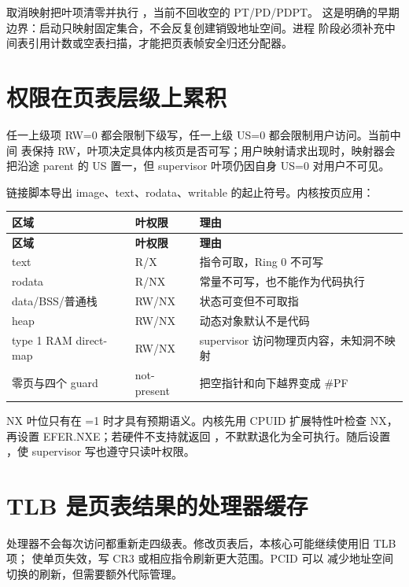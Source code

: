 取消映射把叶项清零并执行 ，当前不回收空的 PT/PD/PDPT。
这是明确的早期边界：启动只映射固定集合，不会反复创建销毁地址空间。进程
阶段必须补充中间表引用计数或空表扫描，才能把页表帧安全归还分配器。

\section{权限在页表层级上累积}

任一上级项 RW=0 都会限制下级写，任一上级 US=0 都会限制用户访问。当前中间
表保持 RW，叶项决定具体内核页是否可写；用户映射请求出现时，映射器会把沿途
parent 的 US 置一，但 supervisor 叶项仍因自身 US=0 对用户不可见。

链接脚本导出 image、text、rodata、writable 的起止符号。内核按页应用：

\begin{longtable}{L{0.23\textwidth}L{0.18\textwidth}L{0.45\textwidth}}
\toprule
\textbf{区域} & \textbf{叶权限} & \textbf{理由}\\
\midrule
\endfirsthead
\toprule
\textbf{区域} & \textbf{叶权限} & \textbf{理由}\\
\midrule
\endhead
text & R/X & 指令可取，Ring 0 不可写\\
rodata & R/NX & 常量不可写，也不能作为代码执行\\
data/BSS/普通栈 & RW/NX & 状态可变但不可取指\\
heap & RW/NX & 动态对象默认不是代码\\
type 1 RAM direct-map & RW/NX & supervisor 访问物理页内容，未知洞不映射\\
零页与四个 guard & not-present & 把空指针和向下越界变成 \#PF\\
\bottomrule
\end{longtable}

NX 叶位只有在 =1 时才具有预期语义。内核先用 CPUID
扩展特性叶检查 NX，再设置 EFER.NXE；若硬件不支持就返回
，不默默退化为全可执行。随后设置
，使 supervisor 写也遵守只读叶权限。

\section{TLB 是页表结果的处理器缓存}

处理器不会每次访问都重新走四级表。修改页表后，本核心可能继续使用旧 TLB
项； 使单页失效，写 CR3 或相应指令刷新更大范围。PCID 可以
减少地址空间切换的刷新，但需要额外代际管理。

